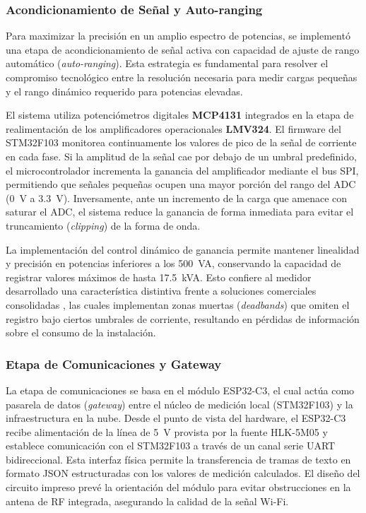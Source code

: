 \documentclass[12pt, a4paper]{article} %
\begin{document}
\subsubsection{Acondicionamiento de Señal y Auto-ranging}

Para maximizar la precisión en un amplio espectro de potencias, se implementó una etapa de acondicionamiento de señal activa con capacidad de ajuste de rango automático (\textit{auto-ranging}). Esta estrategia es fundamental para resolver el compromiso tecnológico entre la resolución necesaria para medir cargas pequeñas y el rango dinámico requerido para potencias elevadas.

El sistema utiliza potenciómetros digitales \textbf{MCP4131} \cite{mcp4131_ds} integrados en la etapa de realimentación de los amplificadores operacionales \textbf{LMV324}. El firmware del STM32F103 monitorea continuamente los valores de pico de la señal de corriente en cada fase. Si la amplitud de la señal cae por debajo de un umbral predefinido, el microcontrolador incrementa la ganancia del amplificador mediante el bus SPI, permitiendo que señales pequeñas ocupen una mayor porción del rango del ADC (\qty{0}{\volt} a \qty{3.3}{\volt}). Inversamente, ante un incremento de la carga que amenace con saturar el ADC, el sistema reduce la ganancia de forma inmediata para evitar el truncamiento (\textit{clipping}) de la forma de onda.


La implementación del control dinámico de ganancia permite mantener linealidad y precisión en potencias inferiores a los \qty{500}{VA}, conservando la capacidad de registrar valores máximos de hasta \qty{17.5}{kVA}. Esto confiere al medidor desarrollado una característica distintiva frente a soluciones comerciales consolidadas \cite{shelly_pro_3em}, las cuales implementan zonas muertas (\textit{deadbands}) que omiten el registro bajo ciertos umbrales de corriente, resultando en pérdidas de información sobre el consumo de la instalación.



\subsubsection{Etapa de Comunicaciones y Gateway}

La etapa de comunicaciones se basa en el módulo ESP32-C3, el cual actúa como pasarela de datos (\textit{gateway}) entre el núcleo de medición local (STM32F103) y la infraestructura en la nube. Desde el punto de vista del hardware, el ESP32-C3 recibe alimentación de la línea de \qty{5}{\volt} provista por la fuente HLK-5M05 y establece comunicación con el STM32F103 a través de un canal serie UART bidireccional. Esta interfaz física permite la transferencia de tramas de texto en formato JSON estructuradas con los valores de medición calculados. El diseño del circuito impreso prevé la orientación del módulo para evitar obstrucciones en la antena de RF integrada, asegurando la calidad de la señal Wi-Fi.
\end{document}
